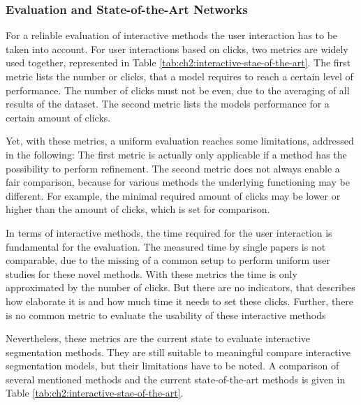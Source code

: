 \subsubsection{Evaluation and State-of-the-Art Networks}
For a reliable evaluation of interactive methods the user interaction has to be taken into account.
For user interactions based on clicks, two metrics are widely used together, represented in Table \ref{tab:ch2:interactive-stae-of-the-art}. 
The first metric lists the number or clicks, that a model requires to reach a certain level of performance. 
The number of clicks must not be even, due to the averaging of all results of the dataset.
The second metric lists the models performance for a certain amount of clicks.

Yet, with these metrics, a uniform evaluation reaches some limitations, addressed in the following:
The first metric is actually only applicable if a method has the possibility to perform refinement.
The second metric does not always enable a fair comparison, because for various methods the underlying functioning may be different. 
For example, the minimal required amount of clicks may be lower or higher than the amount of clicks, which is set for comparison.

In terms of interactive methods, the time required for the user interaction is fundamental for the evaluation.
The measured time by single papers is not comparable, due to the missing of a common setup to perform uniform user studies for these novel methods.
With these metrics the time is only approximated by the number of clicks.
But there are no indicators, that describes how elaborate it is and how much time it needs to set these clicks.
Further, there is no common metric to evaluate the usability of these interactive methods

Nevertheless, these metrics are the current state to evaluate interactive segmentation methods.
They are still suitable to meaningful compare interactive segmentation models, but their limitations have to be noted.
A comparison of several mentioned methods and the current state-of-the-art methods is given in Table \ref{tab:ch2:interactive-stae-of-the-art}.



